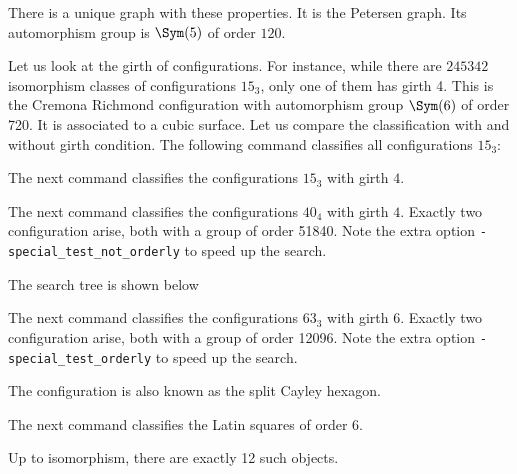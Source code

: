 
There is a unique graph with these properties. 
It is the Petersen graph. 
Its automorphism group is $\Sym(5)$ of order $120.$

\bigskip

Let us look at the girth of configurations.
For instance, while there are $245342$ 
isomorphism classes of configurations $15_3$, 
only one of them has girth 4. 
This is the Cremona Richmond configuration 
with automorphism group $\Sym(6)$ of order 720. 
It is associated to a cubic surface.
Let us compare the classification with and without girth condition.
The following command classifies all configurations $15_3$:


The next command classifies the configurations $15_3$ with girth $4.$ 



\bigskip


The next command classifies the configurations $40_4$ with girth $4.$ 
Exactly two configuration arise, both with a group of order 51840. 
Note the extra option \verb'-special_test_not_orderly' to speed up the search.


The search tree is shown below



\bigskip

The next command classifies the configurations $63_3$ with girth $6.$ 
Exactly two configuration arise, both with a group of order 12096. 
Note the extra option \verb'-special_test_orderly' to speed up the search.


The configuration is also known as the split Cayley hexagon.


\bigskip

The next command classifies the Latin squares of order $6.$ 


Up to isomorphism, there are exactly 12 such objects.


\bigskip




